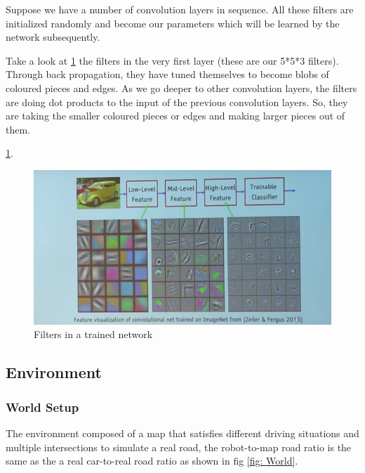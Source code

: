 Suppose we have a number of convolution layers in sequence.
 All these filters are initialized randomly and become our parameters which will be learned by the network subsequently.
 
 Take a look at \ref{fig: Filters in a trained network} the filters in the very first layer (these are our 5*5*3 filters). Through back propagation, they have tuned themselves to become blobs of coloured pieces and edges. As we go deeper to other convolution layers, the filters are doing dot products to the input of the previous convolution layers. So, they are taking the smaller coloured pieces or edges and making larger pieces out of them.
 
\ref{fig: Filters in a trained network}. 
\begin{figure}%
    \center
	\includegraphics[width=1\textwidth]{images/Learningprocess/nn.png}
	
    \caption[Filters in a trained network]{Filters in a trained network}\label{fig: Filters in a trained network}%
\end{figure}
 
\subsection{Environment}
\subsubsection{World Setup}
\hspace{2cm}The environment composed of a map that satisfies different driving situations and multiple intersections to simulate a real road, the robot-to-map road ratio is the same as the a real car-to-real road ratio as shown in fig \ref{fig: World}. 


